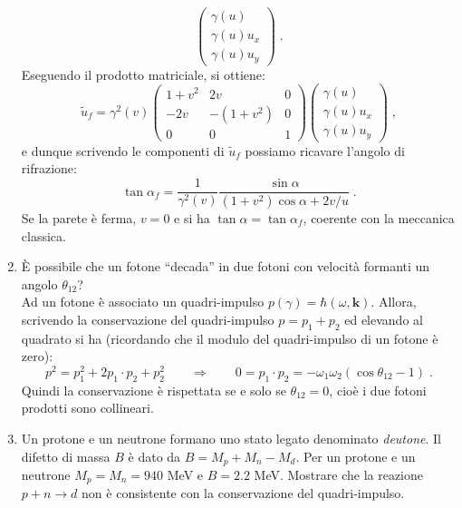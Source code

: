 \begin{enumerate}
\begin{equation}
\begin{pmatrix}
\gamma(u) \\
\gamma(u)u_x \\
\gamma(u)u_y
\end{pmatrix}\;.
\end{equation}
Eseguendo il prodotto matriciale, si ottiene:
\begin{equation}
\tilde{u}_f=\gamma^2(v)\begin{pmatrix}
1+v^2 & 2v & 0 \\
-2v & -(1+v^2) & 0 \\
0 & 0 & 1
\end{pmatrix}\begin{pmatrix}
\gamma(u) \\
\gamma(u)u_x \\
\gamma(u)u_y
\end{pmatrix}\;,
\end{equation}
e dunque scrivendo le componenti di $\tilde{u}_f$ possiamo ricavare l'angolo di rifrazione:
\begin{equation}
\tan\alpha_f=\frac{1}{\gamma^2(v)}\frac{\sin\alpha}{(1+v^2)\cos\alpha+2v/u}\;.
\end{equation}
Se la parete è ferma, $v=0$ e si ha $\tan\alpha=\tan\alpha_f$, coerente con la meccanica classica.
\item È possibile che un fotone ``decada'' in due fotoni con velocità formanti un angolo $\theta_{12}$? \\

Ad un fotone è associato un quadri-impulso $p(\gamma)=\hbar(\omega,\mathbf{k})$. Allora, scrivendo la conservazione del 
quadri-impulso $p=p_1+p_2$ ed elevando al quadrato si ha (ricordando che il modulo del quadri-impulso di un fotone è zero):
\begin{equation}
p^2=p_1^2+2p_1\cdot p_2+p_2^2\qquad \Longrightarrow\qquad 0=p_1\cdot p_2=-\omega_1\omega_2(\cos\theta_{12}-1)\;.
\end{equation}
Quindi la conservazione è rispettata se e solo se $\theta_{12}=0$, cioè i due fotoni prodotti sono collineari.
\item  Un protone e un neutrone formano uno stato legato denominato \textit{deutone}. Il difetto di massa $B$ è dato da $B=M_p+M_n-M_d$. Per un protone e un neutrone $M_p = M_n= 940$ MeV e $B=2.2$ MeV. Mostrare che la reazione $p+n\to d$ non è consistente con la conservazione del quadri-impulso. \\


\end{enumerate}
